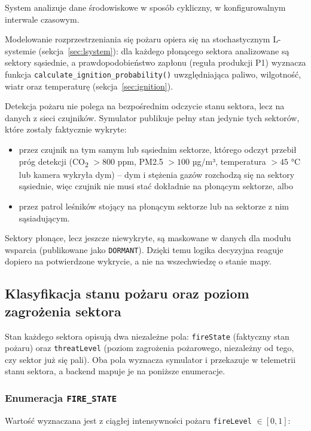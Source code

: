 \documentclass[11pt,a4paper]{article}
\begin{document}
System analizuje dane środowiskowe w sposób cykliczny, w konfigurowalnym interwale czasowym.

Modelowanie rozprzestrzeniania się pożaru opiera się na stochastycznym L-systemie (sekcja~\ref{sec:lsystem}): dla każdego płonącego sektora analizowane są sektory sąsiednie, a prawdopodobieństwo zapłonu (reguła produkcji P1) wyznacza funkcja \texttt{calculate\_ignition\_probability()} uwzględniająca paliwo, wilgotność, wiatr oraz temperaturę (sekcja~\ref{sec:ignition}).

Detekcja pożaru nie polega na bezpośrednim odczycie stanu sektora, lecz na danych z sieci czujników. Symulator publikuje pełny stan jedynie tych sektorów, które zostały faktycznie wykryte:
\begin{itemize}
    \item przez czujnik na tym samym lub sąsiednim sektorze, którego odczyt przebił próg detekcji (CO\textsubscript{2} $> 800$ ppm, PM2.5 $> 100$ µg/m³, temperatura $> 45$ °C lub kamera wykryła dym) -- dym i stężenia gazów rozchodzą się na sektory sąsiednie, więc czujnik nie musi stać dokładnie na płonącym sektorze, albo
    \item przez patrol leśników stojący na płonącym sektorze lub na sektorze z nim sąsiadującym.
\end{itemize}

Sektory płonące, lecz jeszcze niewykryte, są maskowane w danych dla modułu wsparcia (publikowane jako \texttt{DORMANT}). Dzięki temu logika decyzyjna reaguje dopiero na potwierdzone wykrycie, a nie na wszechwiedzę o stanie mapy.

\subsection{Klasyfikacja stanu pożaru oraz poziom zagrożenia sektora}
\label{sec:fire-threat-enums}

Stan każdego sektora opisują dwa niezależne pola: \texttt{fireState} (faktyczny stan pożaru) oraz \texttt{threatLevel} (poziom zagrożenia pożarowego, niezależny od tego, czy sektor już się pali). Oba pola wyznacza symulator i przekazuje w telemetrii stanu sektora, a backend mapuje je na poniższe enumeracje.

\subsubsection*{Enumeracja \texttt{FIRE\_STATE}}

Wartość wyznaczana jest z ciągłej intensywności pożaru \texttt{fireLevel} $\in [0,1]$:
\end{document}
